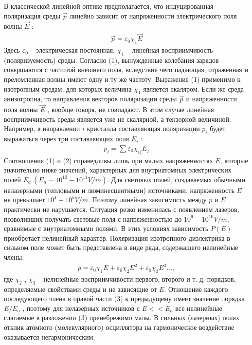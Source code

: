 \documentclass[twocolumn]{article}
\begin{document}
В классической линейной оптике предполагается, что индуцированная
поляризация среды $\vec{p}$ линейно зависит от напряженности
электрического поля волны $\vec{E}$ :\begin{align}
\vec{p} = \varepsilon_0 \chi_1 \vec{E}
\end{align}Здесь $\varepsilon_0$ -- электрическая постоянная; $\chi_1$ -- линейная
восприимчивость (поляризуемость) среды. Согласно (1), вынужденные
колебания зарядов совершаются с частотой внешнего поля, вследствие чего
падающая, отраженная и преломленная волны имеют одну и ту же частоту.
Выражение (1) применимо к изотропным средам, для которых величина
$\chi_1$ является скаляром. Если же среда анизотропна, то направления
векторов поляризации среды $\vec{p}$ и напряженности поля волны
$\vec{E}$ , вообще говоря, не совпадают. В этом случае линейная
восприимчивость среды является уже не скалярной, а тензорной величиной.
Например, в направлении $i$ кристалла составляющая поляризации $p_i$
будет выражаться через три составляющих поля $E_i$ :\begin{align}
p_i = \sum \varepsilon_0 \chi_{ij}E_{j}
\end{align}Соотношения (1) и (2) справедливы лишь при малых напряженнoстях $E$,
которые значительно ниже значений, характерных для внутриатомных
электрических полей $E_a\  (E_a \sim 10^{10} - 10^{11} V/m)$. Для световых
полей, создаваемых обычными нелазерными (тепловыми и люминесцентными)
источниками, напряженность ${E}$ не превышает $10^4-10^5 V/m$. Поэтому
линейная зависимость между ${p}$ и ${E}$ практически не нарушается.
Ситуация резко изменилась с появлением лазеров, позволивших получать
световые поля с напряженностью до $10^9 - 10^{10} V/m$, сравнимые с
внутриатомными полями. В этих условиях зависимость $P( E )$ приобретает
нелинейный характер. Поляризация изотропного диэлектрика в сильном поле
может быть представлена в виде ряда, содержащего нелинейные члены:\begin{align}
p = \varepsilon_0\chi_1E+\varepsilon_0\chi_2E^2+\varepsilon_0\chi_3E^3...,
\end{align}где $\chi_2$ , $\chi_3$ -- нелинейные восприимчивости первого, второго и т. д.
порядков, определяемые свойствами среды и не зависящие от $ E $. Отношение каждого последующего члена в правой части (3) к предыдущему имеет
значение порядка $E/E_a$ , поэтому для нелазерных источников с
$E << E_a$ все нелинейные слагаемые в разложении (3) пренебрежимо
малы. В сильных (лазерных) полях отклик атомного (молекулярного)
осциллятора на гармоническое воздействие оказывается негармоническим.
\end{document}
